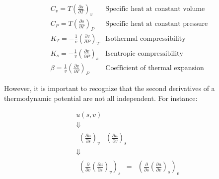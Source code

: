 \documentclass[twocolumn,10pt]{asme2ej}
\begin{document}
\[\begin{array}{*{20}{c}}
{{C_v} = T{{\left( {\frac{{\partial s}}{{\partial T}}} \right)}_v}}&{{\text{Specific heat at constant volume}}}\\
{{C_P} = T{{\left( {\frac{{\partial s}}{{\partial T}}} \right)}_P}}&{{\text{Specific heat at constant pressure}}}\\
{{K_T} =  - \frac{1}{v}{{\left( {\frac{{\partial v}}{{\partial P}}} \right)}_T}}&{{\text{Isothermal compressibility}}}\\
{{K_s} =  - \frac{1}{v}{{\left( {\frac{{\partial v}}{{\partial P}}} \right)}_s}}&{{\text{Isentropic compressibility}}}\\
{\beta  = \frac{1}{v}{{\left( {\frac{{\partial v}}{{\partial T}}} \right)}_P}}&{{\text{Coefficient of thermal expansion}}}
\end{array}\]

However, it is important to recognize that the second derivatives of a thermodynamic potential are not all independent. For instance:

\[\begin{array}{c}
u\left( {s,v} \right)\\
 \Downarrow \\
\begin{array}{*{20}{c}}
{{{\left( {\frac{{\partial u}}{{\partial s}}} \right)}_v}}&{{{\left( {\frac{{\partial u}}{{\partial v}}} \right)}_s}}
\end{array}\\
 \Downarrow \\
\begin{array}{*{20}{c}}
{{{\left( {\frac{\partial }{{\partial v}}{{\left( {\frac{{\partial u}}{{\partial s}}} \right)}_v}} \right)}_s}}& = &{{{\left( {\frac{\partial }{{\partial s}}{{\left( {\frac{{\partial u}}{{\partial v}}} \right)}_s}} \right)}_v}}
\end{array}
\end{array}\]
\end{document}
